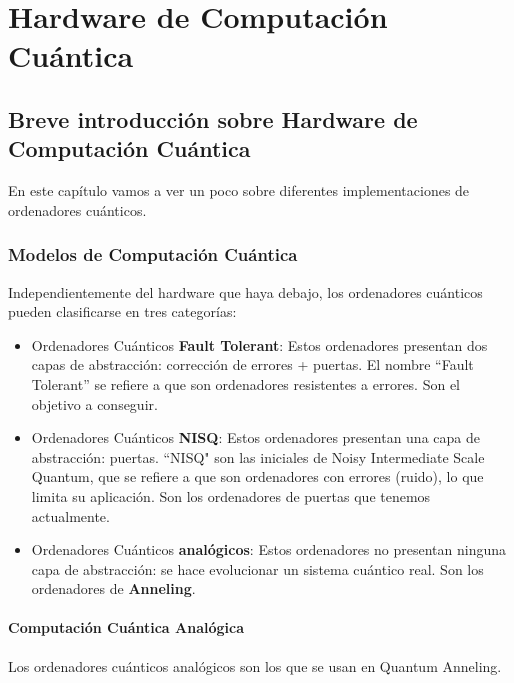 
\part{Hardware de Computación Cuántica}




\chapter{Breve introducción sobre Hardware de Computación Cuántica}

En este capítulo vamos a ver un poco sobre diferentes implementaciones de ordenadores cuánticos.

\section{Modelos de Computación Cuántica}

Independientemente del hardware que haya debajo, los ordenadores cuánticos pueden clasificarse en tres categorías:
\begin{itemize}
	\item Ordenadores Cuánticos \textbf{Fault Tolerant}: Estos ordenadores presentan dos capas de abstracción: corrección de errores + puertas. El nombre ``Fault Tolerant'' se refiere a que son ordenadores resistentes a errores. Son el objetivo a conseguir.
	\item Ordenadores Cuánticos \textbf{NISQ}: Estos ordenadores presentan una capa de abstracción: puertas. ``NISQ" son las iniciales de Noisy Intermediate Scale Quantum, que se refiere a que son ordenadores con errores (ruido), lo que limita su aplicación. Son los ordenadores de puertas que tenemos actualmente.
	\item Ordenadores Cuánticos \textbf{analógicos}: Estos ordenadores no presentan ninguna capa de abstracción: se hace evolucionar un sistema cuántico real. Son los ordenadores de \textbf{Anneling}.
\end{itemize}



\subsection{Computación Cuántica Analógica}

Los ordenadores cuánticos analógicos son los que se usan en Quantum Anneling.

